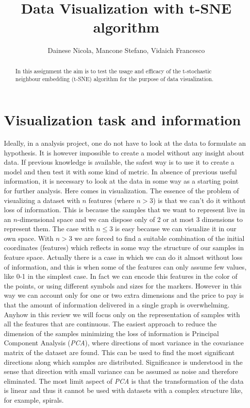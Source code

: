 \documentclass[%
 aip,
 jmp,%
 amsmath,amssymb,
 reprint,%
]{revtex4-1}
\begin{document}
\title[Laboratory of Computational Physics module b]{Data Visualization with t-SNE algorithm}%

\author{Dainese Nicola, Mancone Stefano, Vidaich Francesco}
\begin{abstract}
In this assignment the aim is to test the usage and efficacy of the
t-stochastic neighbour embedding (t-SNE) algorithm for the purpose of
data visualization.
\end{abstract}
\maketitle

\section{Visualization task and information}
Ideally, in a analysis project, one do not have to look at the data to
formulate an hypothesis. It is however impossible to create a model
without any insight about data. If previous knowledge is available, the
safest way is to use it to create a model and then test it with some kind
of metric. In absence of previous useful information, it is necessary
to look at the data in some way as a starting point for further analysis.
Here comes in visualization. The essence of the problem of visualizing a
dataset with $n$ features (where $n > 3$) is that we can't do it without
loss of information. This is because the samples that we want to represent
live in an $n$-dimensional space and we can dispose only of 2 or at most
3 dimensions to represent them.
The case with $n \leq 3$ is easy because we can visualize it in our
own space. With $n > 3$ we are forced to find a suitable combination of
the initial coordinates (features) which reflects in some way the structure
of our samples in feature space. Actually there is a case in which we can
do it almost without loss of information, and this is when some of the
features can only assume few values, like 0-1 in the simplest case.
In fact we can encode this features in the color of the points, or using
different symbols and sizes for the markers.
However in this way we can account only for one or two extra dimensions
and the price to pay is that the amount of information delivered in a
single graph is overwhelming.
Anyhow in this review we will focus only on the representation of samples
with all the features that are continuous.
The easiest approach to reduce the dimension of the samples minimizing
the loss of information is Principal
Component Analysis (\textit{PCA}), where directions of most variance in the
covariance matrix of the dataset are found. This can be used to find
the most significant directions along which samples are distributed.
Significance is understood in the sense that direction with small variance
can be assumed as noise and therefore eliminated.
The most limit aspect of \textit{PCA} is that the transformation of the data
is linear and thus it cannot be used with datasets with a complex structure
like, for example, spirals.
\end{document}
